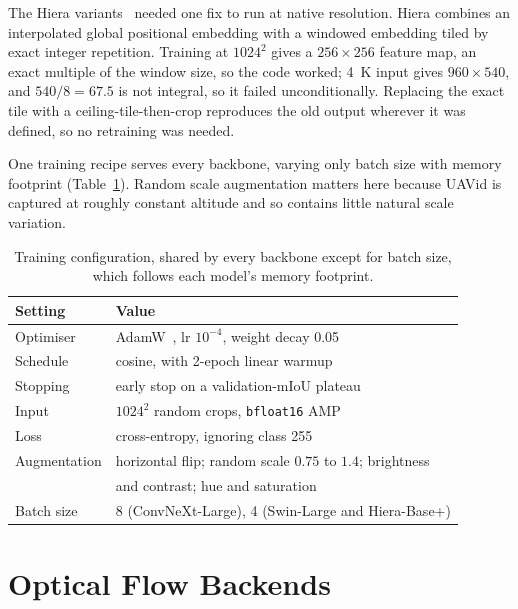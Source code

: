 \documentclass[report.tex]{subfiles}
\begin{document}
The Hiera variants~\cite{hiera2023} needed one fix to run at native
resolution. Hiera combines an interpolated global positional embedding with a
windowed embedding tiled by exact integer repetition. Training at $1024^2$
gives a $256 \times 256$ feature map, an exact multiple of the window size, so
the code worked; \SI{4}{K} input gives $960 \times 540$, and $540/8 = 67.5$ is
not integral, so it failed unconditionally. Replacing the exact tile with a
ceiling-tile-then-crop reproduces the old output wherever it was defined, so no
retraining was needed.

One training recipe serves every backbone, varying only batch size with memory
footprint (Table~\ref{tab:trainhp}). Random scale augmentation matters here
because UAVid is captured at roughly constant altitude and so contains little
natural scale variation.

\begin{table}[t]
    \centering
    \caption[Training hyper-parameters]{Training configuration, shared by every
    backbone except for batch size, which follows each model's memory
    footprint.}
    \label{tab:trainhp}
    \footnotesize
    \begin{tabular}{@{}ll@{}}
        \toprule
        \textbf{Setting} & \textbf{Value} \\
        \midrule
        Optimiser        & AdamW~\cite{adamw2019}, lr $10^{-4}$,
                           weight decay 0.05 \\
        Schedule         & cosine, with 2-epoch linear warmup \\
        Stopping         & early stop on a validation-mIoU plateau \\
        Input            & $1024^2$ random crops, \texttt{bfloat16} AMP \\
        Loss             & cross-entropy, ignoring class 255 \\
        Augmentation     & horizontal flip; random scale $0.75$ to $1.4$;
                           brightness \\
                         & and contrast; hue and saturation \\
        Batch size       & 8 (ConvNeXt-Large), 4 (Swin-Large and Hiera-Base+) \\
        \bottomrule
    \end{tabular}
\end{table}

\section{Optical Flow Backends}
\label{sec:flowbackends}
\end{document}
